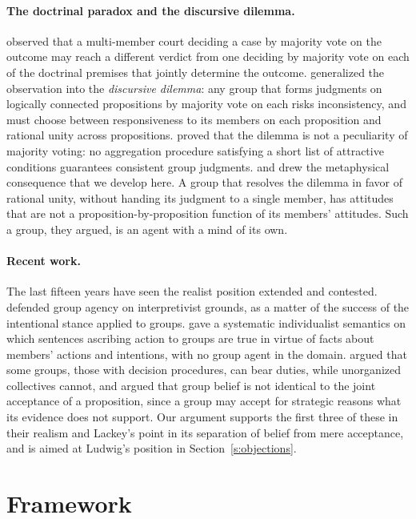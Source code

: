 \documentclass{situationist-preprint}
\begin{document}
\paragraph{The doctrinal paradox and the discursive dilemma.} \citet{KornhauserSager1986} observed that a multi-member court deciding a case by majority vote on the outcome may reach a different verdict from one deciding by majority vote on each of the doctrinal premises that jointly determine the outcome. \citet{Pettit2001} generalized the observation into the \emph{discursive dilemma}: any group that forms judgments on logically connected propositions by majority vote on each risks inconsistency, and must choose between responsiveness to its members on each proposition and rational unity across propositions. \citet{ListPettit2002} proved that the dilemma is not a peculiarity of majority voting: no aggregation procedure satisfying a short list of attractive conditions guarantees consistent group judgments. \citet{Pettit2003} and \citet{ListPettit2011} drew the metaphysical consequence that we develop here. A group that resolves the dilemma in favor of rational unity, without handing its judgment to a single member, has attitudes that are not a proposition-by-proposition function of its members' attitudes. Such a group, they argued, is an agent with a mind of its own.

\paragraph{Recent work.} The last fifteen years have seen the realist position extended and contested. \citet{Tollefsen2015} defended group agency on interpretivist grounds, as a matter of the success of the intentional stance \citep{Dennett1987} applied to groups. \citet{Ludwig2016} gave a systematic individualist semantics on which sentences ascribing action to groups are true in virtue of facts about members' actions and intentions, with no group agent in the domain. \citet{Collins2019} argued that some groups, those with decision procedures, can bear duties, while unorganized collectives cannot, and \citet{Lackey2021} argued that group belief is not identical to the joint acceptance of a proposition, since a group may accept for strategic reasons what its evidence does not support. Our argument supports the first three of these in their realism and Lackey's point in its separation of belief from mere acceptance, and is aimed at Ludwig's position in Section~\ref{s:objections}.

\section{Framework}\label{s:framework}
\end{document}
